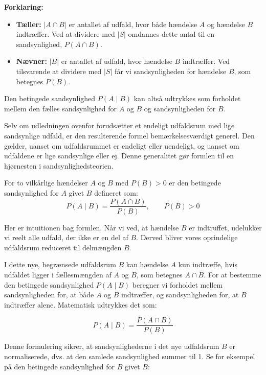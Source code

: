 \textbf{Forklaring:}

\begin{itemize}
    \item \textbf{Tæller:} \( |A \cap B| \) er antallet af udfald, hvor både hændelse \( A \) og hændelse \( B \) indtræffer. Ved at dividere med \( |S| \) omdannes dette antal til en sandsynlighed, \( P(A \cap B) \).
    \item \textbf{Nævner:} \( |B| \) er antallet af udfald, hvor hændelse \( B \) indtræffer. Ved tilsvarende at dividere med \( |S| \) får vi sandsynligheden for hændelse \( B \), som betegnes \( P(B) \).
\end{itemize}

Den betingede sandsynlighed \( P(A \mid B) \) kan altså udtrykkes som forholdet mellem den fælles sandsynlighed for \( A \) og \( B \) og sandsynligheden for \( B \).

Selv om udledningen ovenfor forudsætter et endeligt udfaldsrum med lige sandsynlige udfald, er den resulterende formel bemærkelsesværdigt generel. Den gælder, uanset om udfaldsrummet er endeligt eller uendeligt, og uanset om udfaldene er lige sandsynlige eller ej. Denne generalitet gør formlen til en hjørnesten i sandsynlighedsteorien.

\begin{definition}
For to vilkårlige hændelser \( A \) og \( B \) med \( P(B) > 0 \) er den betingede sandsynlighed for \( A \) givet \( B \) defineret som:
\[
P(A \mid B) = \frac{P(A \cap B)}{P(B)}, \qquad P(B) > 0
\]
\end{definition}

Her er intuitionen bag formlen. Når vi ved, at hændelse \( B \) er indtruffet, udelukker vi reelt alle udfald, der ikke er en del af \( B \). Derved bliver vores oprindelige udfaldsrum reduceret til delmængden \( B \).

I dette nye, begrænsede udfaldsrum \( B \) kan hændelse \( A \) kun indtræffe, hvis udfaldet ligger i fællesmængden af \( A \) og \( B \), som betegnes \( A \cap B \). For at bestemme den betingede sandsynlighed \( P(A \mid B) \) beregner vi forholdet mellem sandsynligheden for, at både \( A \) og \( B \) indtræffer, og sandsynligheden for, at \( B \) indtræffer alene. Matematisk udtrykkes det som:

\[
P(A \mid B) = \frac{P(A \cap B)}{P(B)}
\]

Denne formulering sikrer, at sandsynlighederne i det nye udfaldsrum \( B \) er normaliserede, dvs. at den samlede sandsynlighed summer til 1. Se for eksempel på den betingede sandsynlighed for \( B \) givet \( B \):

